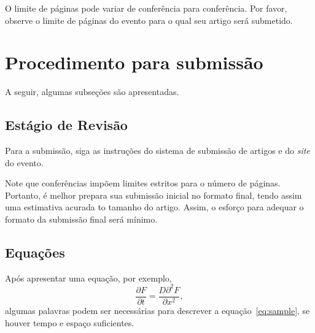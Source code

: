 \documentclass[a4paper]{ifacconf}
\begin{document}

O limite de páginas pode variar de conferência para conferência. Por favor,
observe o limite de páginas do evento para o qual seu artigo será submetido.



\section{Procedimento para submissão}

A seguir, algumas subseções são apresentadas. 

\subsection{Estágio de Revisão}

Para a submissão, siga as instruções do sistema de submissão de artigos e do
{\em site} do evento. 


Note que conferências impõem limites estritos para o número de páginas.
Portanto, é melhor prepara sua submissão inicial no formato final, 
tendo assim uma estimativa acurada to tamanho do artigo. Assim, o
esforço para adequar o formato da submissão final será mínimo. 


\subsection{Equações}



Após apresentar uma equação, por exemplo, 
\begin{equation} \label{eq:sample}
\frac{\partial F}{\partial t} = \frac{D \partial^2 F}{\partial x^2}, 
\end{equation}
algumas palavras podem ser necessárias para descrever a equação~\eqref{eq:sample},
se houver tempo e espaço suficientes. 
\end{document}

